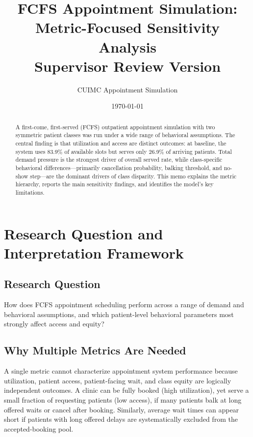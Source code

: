 \documentclass[11pt]{article}
\title{FCFS Appointment Simulation:\\
Metric-Focused Sensitivity Analysis\\[0.4em]
\large Supervisor Review Version}
\author{CUIMC Appointment Simulation}
\date{\today}
\begin{document}
\maketitle

\begin{abstract}
\noindent
A first-come, first-served (FCFS) outpatient appointment simulation with two
symmetric patient classes was run under a wide range of behavioral assumptions.
The central finding is that utilization and access are distinct outcomes: at
baseline, the system uses 83.9\% of available slots but serves only 26.9\% of
arriving patients. Total demand pressure is the strongest driver of overall
served rate, while class-specific behavioral differences---primarily
cancellation probability, balking threshold, and no-show step---are the
dominant drivers of class disparity. This memo explains the metric hierarchy,
reports the main sensitivity findings, and identifies the model's key
limitations.
\end{abstract}

\tableofcontents
\newpage

\section{Research Question and Interpretation Framework}

\subsection*{Research Question}

How does FCFS appointment scheduling perform across a range of demand and
behavioral assumptions, and which patient-level behavioral parameters most
strongly affect access and equity?

\subsection*{Why Multiple Metrics Are Needed}

A single metric cannot characterize appointment system performance because
utilization, patient access, patient-facing wait, and class equity are
logically independent outcomes. A clinic can be fully booked (high
utilization), yet serve a small fraction of requesting patients (low access),
if many patients balk at long offered waits or cancel after booking. Similarly,
average wait times can appear short if patients with long offered delays are
systematically excluded from the accepted-booking pool.
\end{document}

